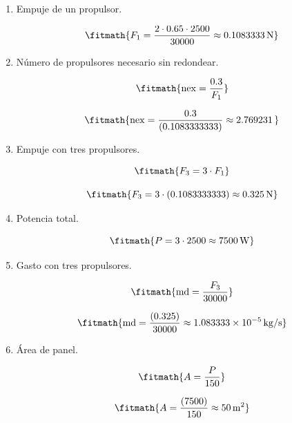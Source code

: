 \begin{enumerate}

\item Empuje de un propulsor.

\[\fitmath{F_{1}=\frac{2\cdot 0.65\cdot 2500}{30000}\approx 0.1083333\,\mathrm{N}}\]

\item Número de propulsores necesario sin redondear.

\[\fitmath{\mathrm{nex}=\frac{0.3}{F_{1}}}\]

\[\fitmath{\mathrm{nex}=\frac{0.3}{(0.1083333333)}\approx 2.769231\,}\]

\item Empuje con tres propulsores.

\[\fitmath{F_{3}=3\cdot F_{1}}\]

\[\fitmath{F_{3}=3\cdot (0.1083333333)\approx 0.325\,\mathrm{N}}\]

\item Potencia total.

\[\fitmath{P=3\cdot 2500\approx 7500\,\mathrm{W}}\]

\item Gasto con tres propulsores.

\[\fitmath{\mathrm{md}=\frac{F_{3}}{30000}}\]

\[\fitmath{\mathrm{md}=\frac{(0.325)}{30000}\approx 1.083333\times10^{-5}\,\mathrm{kg/s}}\]

\item Área de panel.

\[\fitmath{A=\frac{P}{150}}\]

\[\fitmath{A=\frac{(7500)}{150}\approx 50\,\mathrm{m^{2}}}\]

\end{enumerate}
